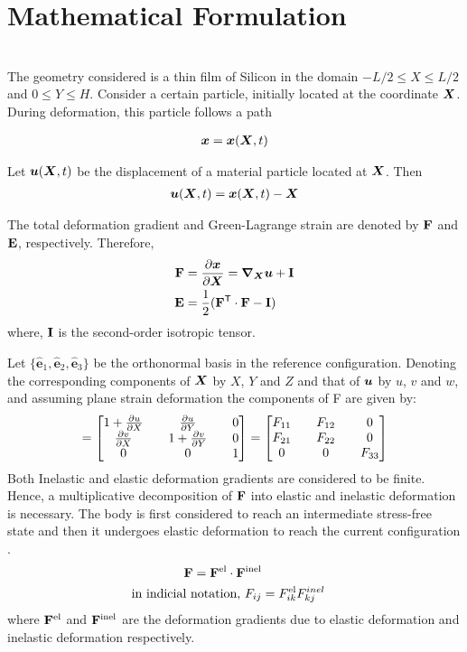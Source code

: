 \documentclass[../main.tex]{subfiles}
\begin{document}
\chapter{Mathematical Formulation}
{\color{red}{Add full stops at the end of equations}} \\
The geometry considered is a thin film of Silicon in the domain $ -L/2 \le X \le L/2$ and $0 \le Y \le H$. Consider a certain particle, initially located at the coordinate ${\bm{X}}$. During deformation, this particle follows a path 


\begin{gather}
{\bm{x}} = {\bm{x}}({\bm{X}},t)
\end{gather}

\vspace{0.25cm}
Let ${\bm{u}}({\bm{X}}, t)$ be the displacement of a material particle located at ${\bm{X}}$. Then
\begin{gather}
    {\bm{u}}({\bm{X}}, t) = {\bm{x}}({\bm{X}}, t) - {\bm{X}}
\end{gather}

The total deformation gradient and Green-Lagrange strain are denoted by $\mathbf{F}$ and $\mathbf{E}$, respectively. Therefore, 
\begin{align}
    \mathbf{F} &= \frac{\partial {\bm{x}}}{\partial {\bm{X}}} = \bm{\nabla}_{\bm{X}} {\bm{u}} + \mathbf{I} \\
    \mathbf{E} &= \frac{1}{2}(\mathbf{F}^{\sf {T}} \cdot \mathbf{F} - \mathbf{I})
\end{align}
where, $\mathbf{I}$ is the second-order isotropic tensor.

Let $\{\hat{\bm{e}}_1, \hat{\bm{e}}_2, \hat{\bm{e}}_3\}$ be the orthonormal basis in the reference configuration. Denoting the corresponding components of ${\bm{X}}$ by $X$, $Y$ and $Z$ and that of ${\bm{u}}$ by $u$, $v$ and $w$, and assuming plane strain deformation the components of F are given by:
\begin{align}
[\F] = 
\begin{bmatrix}
       1 + \pdiff{u}{X} && \pdiff{u}{Y} && 0 \\
       \pdiff{v}{X} && 1 + \pdiff{v}{Y} && 0 \\
       0 && 0 && 1
\end{bmatrix} = \tensor{F}
\end{align}
Both Inelastic and elastic deformation gradients are considered to be finite. Hence, a multiplicative decomposition of $\mathbf{F}$ into elastic and inelastic deformation is necessary. The body is first considered to reach an intermediate stress-free state and then it undergoes elastic deformation to reach the current configuration \citep{1969Lee}.
\begin{align}
\mathbf{F} = \mathbf{F}^{{\rm{el}}} \cdot  \mathbf{F}^{{\rm{inel}}} \label{eq:F_decomposition} \\
    \text{in indicial notation, }F_{ij} &= F^{{\rm{el}}}_{ik}F^{inel}_{kj}
\end{align}
where $\mathbf{F}^{{\rm{el}}}$ and $\mathbf{F}^{{\rm{inel}}}$ are the deformation gradients due to elastic deformation and inelastic deformation respectively.
\end{document}
